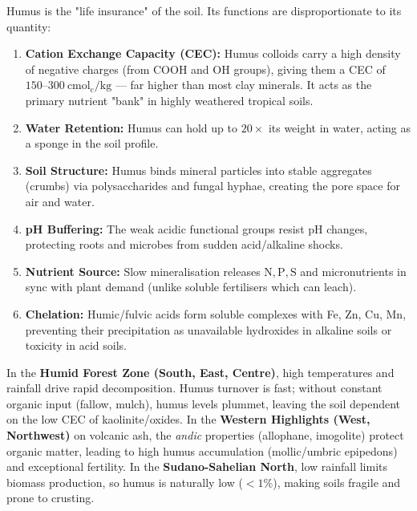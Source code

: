 \documentclass[11pt]{article}
\begin{document}
\begin{propriete}
Humus is the "life insurance" of the soil. Its functions are disproportionate to its quantity:
\begin{enumerate}
    \item \textbf{Cation Exchange Capacity (CEC):} Humus colloids carry a high density of negative charges (from $\mathrm{COOH}$ and $\mathrm{OH}$ groups), giving them a CEC of $150\text{--}300\ \mathrm{cmol_c/kg}$ — far higher than most clay minerals. It acts as the primary nutrient "bank" in highly weathered tropical soils.
    \item \textbf{Water Retention:} Humus can hold up to $20\times$ its weight in water, acting as a sponge in the soil profile.
    \item \textbf{Soil Structure:} Humus binds mineral particles into stable aggregates (crumbs) via polysaccharides and fungal hyphae, creating the pore space for air and water.
    \item \textbf{pH Buffering:} The weak acidic functional groups resist pH changes, protecting roots and microbes from sudden acid/alkaline shocks.
    \item \textbf{Nutrient Source:} Slow mineralisation releases $\mathrm{N, P, S}$ and micronutrients in sync with plant demand (unlike soluble fertilisers which can leach).
    \item \textbf{Chelation:} Humic/fulvic acids form soluble complexes with Fe, Zn, Cu, Mn, preventing their precipitation as unavailable hydroxides in alkaline soils or toxicity in acid soils.
\end{enumerate}
\end{propriete}

\begin{savaistu}
In the \textbf{Humid Forest Zone (South, East, Centre)}, high temperatures and rainfall drive rapid decomposition. Humus turnover is fast; without constant organic input (fallow, mulch), humus levels plummet, leaving the soil dependent on the low CEC of kaolinite/oxides. In the \textbf{Western Highlights (West, Northwest)} on volcanic ash, the \emph{andic} properties (allophane, imogolite) protect organic matter, leading to high humus accumulation (mollic/umbric epipedons) and exceptional fertility. In the \textbf{Sudano-Sahelian North}, low rainfall limits biomass production, so humus is naturally low ($<1\%$), making soils fragile and prone to crusting.
\end{savaistu}
\end{document}
